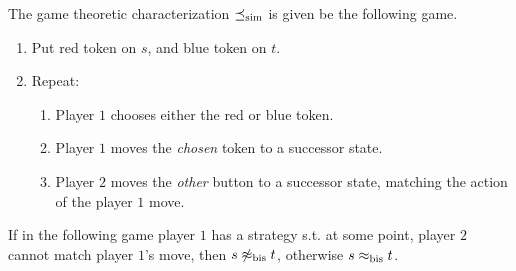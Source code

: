 \begin{theorem}
The game theoretic characterization  $\preceq_{\mathrm{sim}}$ is given be the following game.
\begin{enumerate}
    \item Put red token on $s$, and blue token on $t$.
    \item Repeat:
        \begin{enumerate}
            \item Player $1$ chooses either the red or blue token.
            \item Player $1$ moves the \emph{chosen} token to a successor state.
            \item Player $2$ moves the \emph{other} button to a successor state, matching the action of the player $1$ move.
        \end{enumerate}
\end{enumerate}
If in the following game player $1$ has a strategy s.t. at some point, player $2$ cannot match player $1$'s move, then $s \not\approx_{\mathrm{bis}} t$, otherwise $s \approx_{\mathrm{bis}} t$.
\end{theorem}





